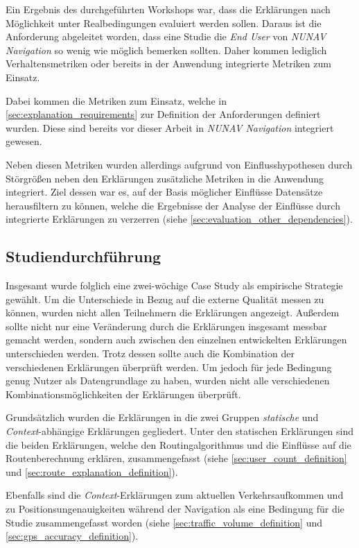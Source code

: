 Ein Ergebnis des durchgeführten Workshops war, dass die Erklärungen nach Möglichkeit unter Realbedingungen evaluiert werden sollen. Daraus ist die Anforderung abgeleitet worden, dass eine Studie die \textit{End User} von \textit{NUNAV Navigation} so wenig wie möglich bemerken sollten. Daher kommen lediglich Verhaltensmetriken oder bereits in der Anwendung integrierte Metriken zum Einsatz.

Dabei kommen die Metriken zum Einsatz, welche in \autoref{sec:explanation_requirements} zur Definition der Anforderungen definiert wurden. Diese sind bereits vor dieser Arbeit in \textit{NUNAV Navigation} integriert gewesen.

Neben diesen Metriken wurden allerdings aufgrund von Einflusshypothesen durch Störgrößen neben den Erklärungen zusätzliche Metriken in die Anwendung integriert. Ziel dessen war es, auf der Basis möglicher Einflüsse Datensätze herausfiltern zu können, welche die Ergebnisse der Analyse der Einflüsse durch integrierte Erklärungen zu verzerren (siehe \autoref{sec:evaluation_other_dependencies}).

\subsection{Studiendurchführung}

Insgesamt wurde folglich eine zwei-wöchige Case Study als empirische Strategie gewählt. Um die Unterschiede in Bezug auf die externe Qualität messen zu können, wurden nicht allen Teilnehmern die Erklärungen angezeigt. Außerdem sollte nicht nur eine Veränderung durch die Erklärungen insgesamt messbar gemacht werden, sondern auch zwischen den einzelnen entwickelten Erklärungen unterschieden werden. Trotz dessen sollte auch die Kombination der verschiedenen Erklärungen überprüft werden. Um jedoch für jede Bedingung genug Nutzer als Datengrundlage zu haben, wurden nicht alle verschiedenen Kombinationsmöglichkeiten der Erklärungen überprüft.

Grundsätzlich wurden die Erklärungen in die zwei Gruppen \textit{statische} und \textit{Context}-abhängige Erklärungen gegliedert. Unter den statischen Erklärungen sind die beiden Erklärungen, welche den Routingalgorithmus und die Einflüsse auf die Routenberechnung erklären, zusammengefasst (siehe \autoref{sec:user_count_definition} und \autoref{sec:route_explanation_definition}).

Ebenfalls sind die \textit{Context}-Erklärungen zum aktuellen Verkehrsaufkommen und zu Positionsungenauigkeiten während der Navigation als eine Bedingung für die Studie zusammengefasst worden (siehe \autoref{sec:traffic_volume_definition} und \autoref{sec:gps_accuracy_definition}).

